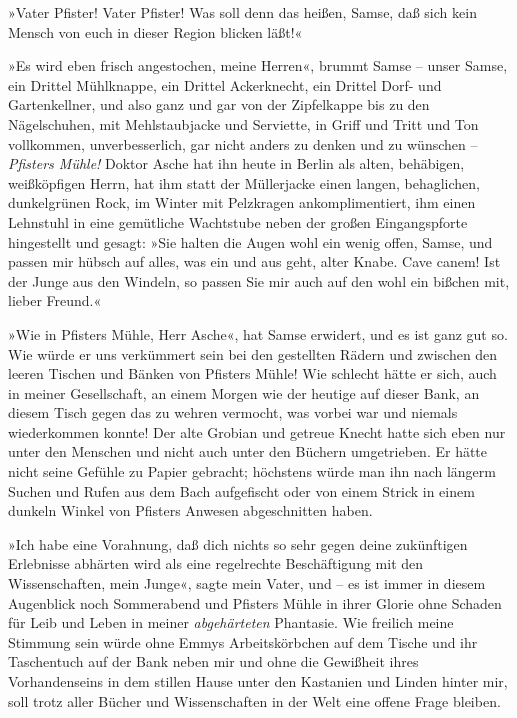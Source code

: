»Vater Pfister! Vater Pfister! Was soll denn das heißen, Samse, daß
sich kein Mensch von euch in dieser Region blicken läßt!«

»Es wird eben frisch angestochen, meine Herren«, brummt Samse –
unser Samse, ein Drittel Mühlknappe, ein Drittel Ackerknecht, ein
Drittel Dorf- und Gartenkellner, und also ganz und gar von der
Zipfelkappe bis zu den Nägelschuhen, mit Mehlstaubjacke und
Serviette, in Griff und Tritt und Ton vollkommen, unverbesserlich,
gar nicht anders zu denken und zu wünschen – \emph{Pfisters Mühle!}
Doktor Asche hat ihn heute in Berlin als alten, behäbigen,
weißköpfigen Herrn, hat ihm statt der Müllerjacke einen langen,
behaglichen, dunkelgrünen Rock, im Winter mit Pelzkragen
ankomplimentiert, ihm einen Lehnstuhl in eine gemütliche Wachtstube
neben der großen Eingangspforte hingestellt und gesagt: »Sie halten
die Augen wohl ein wenig offen, Samse, und passen mir hübsch auf
alles, was ein und aus geht, alter Knabe. Cave canem! Ist der Junge
aus den Windeln, so passen Sie mir auch auf den wohl ein bißchen
mit, lieber Freund.«

»Wie in Pfisters Mühle, Herr Asche«, hat Samse erwidert, und es ist
ganz gut so. Wie würde er uns verkümmert sein bei den gestellten
Rädern und zwischen den leeren Tischen und Bänken von Pfisters
Mühle! Wie schlecht hätte er sich, auch in meiner Gesellschaft, an
einem Morgen wie der heutige auf dieser Bank, an diesem Tisch gegen
das zu wehren vermocht, was vorbei war und niemals wiederkommen
konnte! Der alte Grobian und getreue Knecht hatte sich eben nur
unter den Menschen und nicht auch unter den Büchern umgetrieben. Er
hätte nicht seine Gefühle zu Papier gebracht; höchstens würde man
ihn nach längerm Suchen und Rufen aus dem Bach aufgefischt oder von
einem Strick in einem dunkeln Winkel von Pfisters Anwesen
abgeschnitten haben.

»Ich habe eine Vorahnung, daß dich nichts so sehr gegen deine
zukünftigen Erlebnisse abhärten wird als eine regelrechte
Beschäftigung mit den Wissenschaften, mein Junge«, sagte mein
Vater, und – es ist immer in diesem Augenblick noch Sommerabend und
Pfisters Mühle in ihrer Glorie ohne Schaden für Leib und Leben in
meiner \emph{abgehärteten} Phantasie. Wie freilich meine Stimmung
sein würde ohne Emmys Arbeitskörbchen auf dem Tische und ihr
Taschentuch auf der Bank neben mir und ohne die Gewißheit ihres
Vorhandenseins in dem stillen Hause unter den Kastanien und Linden
hinter mir, soll trotz aller Bücher und Wissenschaften in der Welt
eine offene Frage bleiben.

